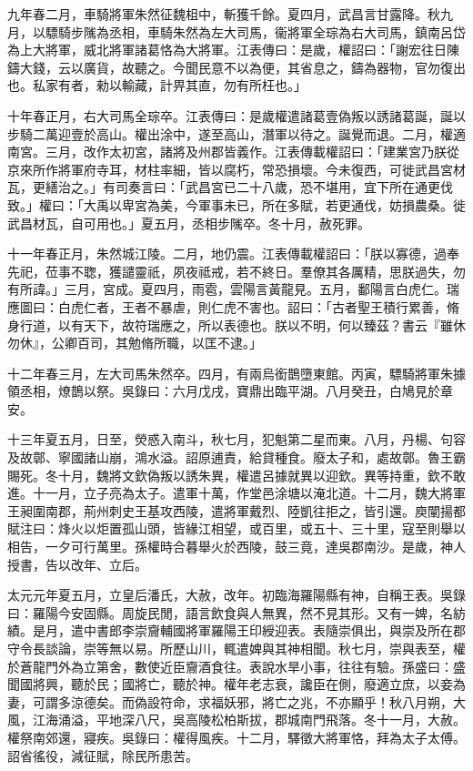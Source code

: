 \begin{pinyinscope}
九年春二月，車騎將軍朱然征魏柤中，斬獲千餘。夏四月，武昌言甘露降。秋九月，以驃騎步隲為丞相，車騎朱然為左大司馬，衞將軍全琮為右大司馬，鎮南呂岱為上大將軍，威北將軍諸葛恪為大將軍。江表傳曰：是歲，權詔曰：「謝宏往日陳鑄大錢，云以廣貨，故聽之。今聞民意不以為便，其省息之，鑄為器物，官勿復出也。私家有者，勑以輸藏，計畀其直，勿有所枉也。」

十年春正月，右大司馬全琮卒。江表傳曰：是歲權遣諸葛壹偽叛以誘諸葛誕，誕以步騎二萬迎壹於高山。權出涂中，遂至高山，潛軍以待之。誕覺而退。二月，權適南宮。三月，改作太初宮，諸將及州郡皆義作。江表傳載權詔曰：「建業宮乃朕從京來所作將軍府寺耳，材柱率細，皆以腐朽，常恐損壞。今未復西，可徙武昌宮材瓦，更繕治之。」有司奏言曰：「武昌宮已二十八歲，恐不堪用，宜下所在通更伐致。」權曰：「大禹以卑宮為美，今軍事未已，所在多賦，若更通伐，妨損農桑。徙武昌材瓦，自可用也。」夏五月，丞相步隲卒。冬十月，赦死罪。

十一年春正月，朱然城江陵。二月，地仍震。江表傳載權詔曰：「朕以寡德，過奉先祀，莅事不聦，獲譴靈祇，夙夜祗戒，若不終日。羣僚其各厲精，思朕過失，勿有所諱。」三月，宮成。夏四月，雨雹，雲陽言黃龍見。五月，鄱陽言白虎仁。瑞應圖曰：白虎仁者，王者不暴虐，則仁虎不害也。詔曰：「古者聖王積行累善，脩身行道，以有天下，故符瑞應之，所以表德也。朕以不明，何以臻茲？書云『雖休勿休』，公卿百司，其勉脩所職，以匡不逮。」

十二年春三月，左大司馬朱然卒。四月，有兩烏銜鵲墮東館。丙寅，驃騎將軍朱據領丞相，燎鵲以祭。吳錄曰：六月戊戌，寶鼎出臨平湖。八月癸丑，白鳩見於章安。

十三年夏五月，日至，熒惑入南斗，秋七月，犯魁第二星而東。八月，丹楊、句容及故鄣、寧國諸山崩，鴻水溢。詔原逋責，給貸種食。廢太子和，處故鄣。魯王霸賜死。冬十月，魏將文欽偽叛以誘朱異，權遣呂據就異以迎欽。異等持重，欽不敢進。十一月，立子亮為太子。遣軍十萬，作堂邑涂塘以淹北道。十二月，魏大將軍王昶圍南郡，荊州刺史王基攻西陵，遣將軍戴烈、陸凱往拒之，皆引還。庾闡揚都賦注曰：烽火以炬置孤山頭，皆緣江相望，或百里，或五十、三十里，寇至則舉以相告，一夕可行萬里。孫權時合暮舉火於西陵，鼓三竟，達吳郡南沙。是歲，神人授書，告以改年、立后。

太元元年夏五月，立皇后潘氏，大赦，改年。初臨海羅陽縣有神，自稱王表。吳錄曰：羅陽今安固縣。周旋民閒，語言飲食與人無異，然不見其形。又有一婢，名紡績。是月，遣中書郎李崇齎輔國將軍羅陽王印綬迎表。表隨崇俱出，與崇及所在郡守令長談論，崇等無以易。所歷山川，輒遣婢與其神相聞。秋七月，崇與表至，權於蒼龍門外為立第舍，數使近臣齎酒食往。表說水旱小事，往往有驗。孫盛曰：盛聞國將興，聽於民；國將亡，聽於神。權年老志衰，讒臣在側，廢適立庶，以妾為妻，可謂多涼德矣。而偽設符命，求福妖邪，將亡之兆，不亦顯乎！秋八月朔，大風，江海涌溢，平地深八尺，吳高陵松柏斯拔，郡城南門飛落。冬十一月，大赦。權祭南郊還，寢疾。吳錄曰：權得風疾。十二月，驛徵大將軍恪，拜為太子太傅。詔省徭役，減征賦，除民所患苦。


\end{pinyinscope}
